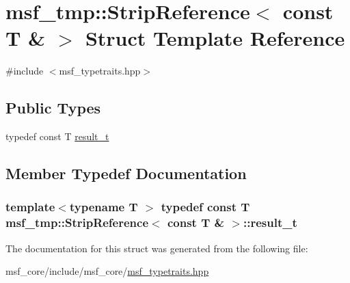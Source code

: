 \hypertarget{structmsf__tmp_1_1StripReference_3_01const_01T_01_6_01_4}{\section{msf\-\_\-tmp\-:\-:Strip\-Reference$<$ const T \& $>$ Struct Template Reference}
\label{structmsf__tmp_1_1StripReference_3_01const_01T_01_6_01_4}
}


{\ttfamily \#include $<$msf\-\_\-typetraits.\-hpp$>$}

\subsection*{Public Types}
\begin{DoxyCompactItemize}
\item 
typedef const T \hyperlink{structmsf__tmp_1_1StripReference_3_01const_01T_01_6_01_4_a3f0da0790a8e34e58f4961f09c76a840}{result\-\_\-t}
\end{DoxyCompactItemize}


\subsection{Member Typedef Documentation}
\hypertarget{structmsf__tmp_1_1StripReference_3_01const_01T_01_6_01_4_a3f0da0790a8e34e58f4961f09c76a840}{
\subsubsection[{result\-\_\-t}]{\setlength{\rightskip}{0pt plus 5cm}template$<$typename T $>$ typedef const T {\bf msf\-\_\-tmp\-::\-Strip\-Reference}$<$ const T \& $>$\-::{\bf result\-\_\-t}}}\label{structmsf__tmp_1_1StripReference_3_01const_01T_01_6_01_4_a3f0da0790a8e34e58f4961f09c76a840}


The documentation for this struct was generated from the following file\-:\begin{DoxyCompactItemize}
\item 
msf\-\_\-core/include/msf\-\_\-core/\hyperlink{msf__typetraits_8hpp}{msf\-\_\-typetraits.\-hpp}\end{DoxyCompactItemize}

